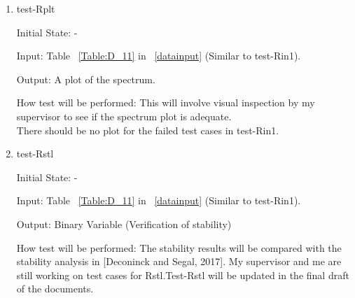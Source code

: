 \documentclass[12pt, titlepage]{article}
\begin{document}
\begin{enumerate}
\item{test-Rplt} 

Initial State: -

Input: Table ~\ref{Table:D_11} in ~\ref{datainput} (Similar to test-Rin1).

Output: A plot of the spectrum.

How test will be performed: This will involve visual inspection by my 
supervisor to see if the spectrum plot is adequate. \\
There should be no plot for the failed test cases in test-Rin1. 

\item{test-Rstl} 

Initial State: -

Input: Table ~\ref{Table:D_11} in ~\ref{datainput} (Similar to test-Rin1).

Output: Binary Variable (Verification of stability) 

How test will be performed: The stability results will be compared with the 
stability analysis in [Deconinck and Segal, 2017].  My supervisor 
and me are still working on test cases for Rstl.Test-Rstl will be updated in 
the final draft of the documents. 

\end{enumerate}
\end{document}
